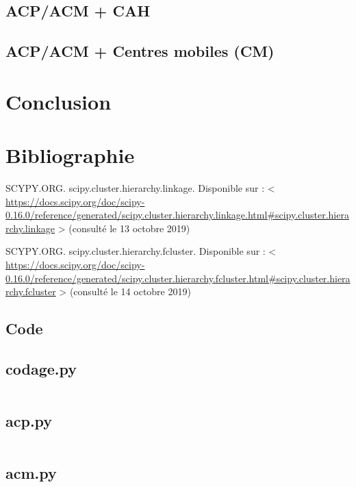 \documentclass{rapportECL}
\begin{document}
\subsection{ACP/ACM + CAH}


\subsection{ACP/ACM + Centres mobiles (CM)}


\section{Conclusion}


\section{Bibliographie}

SCYPY.ORG. scipy.cluster.hierarchy.linkage. Disponible sur : < \url{https://docs.scipy.org/doc/scipy-0.16.0/reference/generated/scipy.cluster.hierarchy.linkage.html#scipy.cluster.hierarchy.linkage} > (consulté le 13 octobre 2019)\newline

SCYPY.ORG. scipy.cluster.hierarchy.fcluster. Disponible sur : < \url{https://docs.scipy.org/doc/scipy-0.16.0/reference/generated/scipy.cluster.hierarchy.fcluster.html#scipy.cluster.hierarchy.fcluster} > (consulté le 14 octobre 2019)\newline


\newpage
\subsection{Code}

\subsection{codage.py}
\inputminted[linenos=True]{python}{scr/codage.py}

\subsection{acp.py}
\inputminted[linenos=True]{python}{scr/acp.py}

\subsection{acm.py}
\inputminted[linenos=True]{python}{scr/acm.py}
\end{document}
